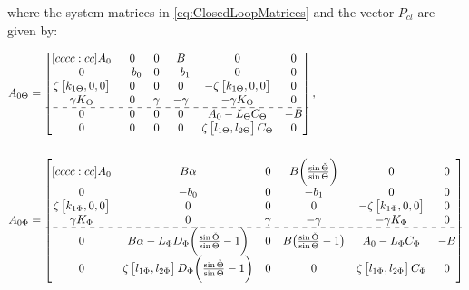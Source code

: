 \documentclass[main.tex]{subfiles}
\begin{document}
	where the system matrices  in  \eqref{eq:ClosedLoopMatrices} and the vector $P_{cl}$ are given by:
	
	\begin{align*}
		A_{0\Theta} &= 
		\begin{bmatrix}[cccc:cc]
		A_0 & 0 & 0 & B & 0 & 0\\
		0 & -b_0 & 0 & -b_1 & 0 & 0\\
		\zeta \begin{bmatrix}k_{1\Theta} , 0 , 0\end{bmatrix} & 0 & 0 & 0 & -\zeta\begin{bmatrix}k_{1\Theta} , 0 , 0\end{bmatrix} & 0\\
		\gamma K_\Theta & 0 & \gamma & -\gamma & -\gamma K_\Theta & 0\\ \hdashline
		0 & 0 & 0 & 0 & A_0 - L_\Theta C_\Theta & -B\\ 
		0 & 0 & 0 & 0 & \zeta \begin{bmatrix}l_{1\Theta} , l_{2\Theta}	\end{bmatrix} C_\Theta & 0
		\end{bmatrix},\\
		\nonumber \\
		A_{0\Phi} &= 
		\begin{bmatrix}[cccc:cc]
		A_0 & B\alpha & 0 & B\bigg( \frac{\sin \check{\Theta}}{\sin \Theta}\bigg) & 0 & 0\\
		0 & -b_0 & 0 & -b_1 & 0 & 0 \\
		\zeta \begin{bmatrix}k_{1\Phi} , 0 , 0\end{bmatrix} & 0 & 0 & 0 & -\zeta\begin{bmatrix}k_{1\Phi} , 0 , 0\end{bmatrix} & 0 \\
		\gamma K_{\Phi} & 0 & \gamma & -\gamma & -\gamma K_{\Phi} & 0\\ \hdashline
		0 & B\alpha -L_\Phi D_{\Phi}\bigg( \frac{\sin \check{\Theta}}{\sin \Theta} - 1\bigg) & 0 & B\big(\frac{\sin \check{\Theta}}{\sin \Theta} - 1\big) & A_0 - L_\Phi C_{\Phi} & -B \\
		0 & \zeta \begin{bmatrix}l_{1\Phi} , l_{2\Phi}\end{bmatrix} D_\Phi\bigg( \frac{\sin \check{\Theta}}{\sin \Theta} - 1\bigg) & 0 & 0 & \zeta \begin{bmatrix}l_{1\Phi} , l_{2\Phi}\end{bmatrix}C_\Phi & 0

\end{bmatrix}
\end{align*}
\end{document}
